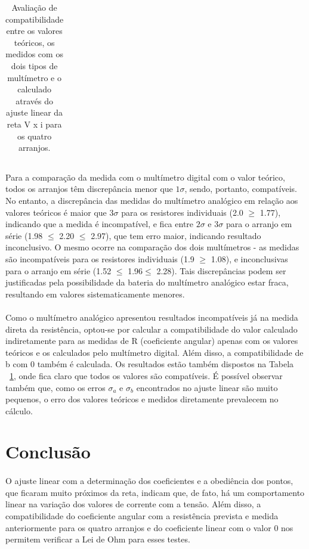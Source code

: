 \documentclass[11pt,a4paper]{article}
\begin{document}
\begin{table}[htb!]
\begin{tabular}{llll}
          \end{tabular}
        \caption{Avaliação de compatibilidade entre os valores teóricos, os medidos com os dois tipos de multímetro e o calculado através do ajuste linear da reta V x i  para os quatro arranjos.}
        \label{tab:compatibilidade}
        \end{table}
        
      \paragraph{}
      Para a comparação da medida com o multímetro digital com o valor teórico, todos os arranjos têm discrepância menor que $1\sigma$, sendo, portanto, compatíveis. No entanto, a discrepância das medidas do multímetro analógico em relação aos valores teóricos é maior que $3\sigma$ para os resistores individuais (2.0 $\geq$ 1.77), indicando que a medida é incompatível, e fica entre $2\sigma$ e $3\sigma$ para o arranjo em série (1.98 $\leq$ 2.20 $\leq$ 2.97), que tem erro maior, indicando resultado inconclusivo. O mesmo ocorre na comparação dos dois multímetros - as medidas são incompatíveis para os resistores individuais (1.9 $\geq$ 1.08), e inconclusivas para o arranjo em série (1.52  $\leq$ 1.96$\leq$ 2.28). Tais discrepâncias podem ser justificadas pela possibilidade da bateria do multímetro analógico estar fraca, resultando em valores sistematicamente menores.
    
      \paragraph{}
      Como o multímetro analógico apresentou resultados incompatíveis já na medida direta da resistência, optou-se por calcular a compatibilidade do valor calculado indiretamente para as medidas de R (coeficiente angular) apenas com os valores teóricos e os calculados pelo multímetro digital. Além disso, a compatibilidade de b com 0 também é calculada. Os resultados estão também  dispostos na Tabela ~\ref{tab:compatibilidade}, onde fica claro que todos os valores são compatíveis. É possível observar também que, como os erros  $\sigma_{a}$ e $\sigma_{b}$ encontrados no ajuste linear são muito pequenos, o erro dos valores teóricos e medidos diretamente prevalecem no cálculo. 

  \section{Conclusão}
      
    \paragraph{}
    O ajuste linear com a determinação dos coeficientes e a obediência dos pontos, que ficaram muito próximos da reta, indicam que, de fato, há um comportamento linear na variação dos valores de corrente com a tensão. Além disso, a compatibilidade do coeficiente angular com a resistência prevista e medida anteriormente para os quatro arranjos e do coeficiente linear com o valor 0 nos permitem verificar a Lei de Ohm para esses testes.
      
\end{document}
